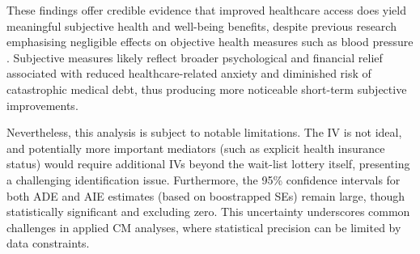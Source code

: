 These findings offer credible evidence that improved healthcare access does yield meaningful subjective health and well-being benefits, despite previous research emphasising negligible effects on objective health measures such as blood pressure \citep{baicker2013oregon}.
Subjective measures likely reflect broader psychological and financial relief associated with reduced healthcare-related anxiety and diminished risk of catastrophic medical debt, thus producing more noticeable short-term subjective improvements.

Nevertheless, this analysis is subject to notable limitations.
The IV is not ideal, and potentially more important mediators (such as explicit health insurance status) would require additional IVs beyond the wait-list lottery itself, presenting a challenging identification issue.
Furthermore, the 95\% confidence intervals for both ADE and AIE estimates (based on boostrapped SEs) remain large, though statistically significant and excluding zero.
This uncertainty underscores common challenges in applied CM analyses, where statistical precision can be limited by data constraints.
